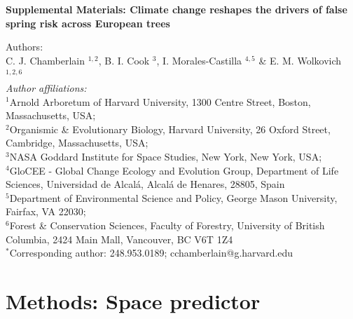 \documentclass{article}\usepackage[]{graphicx}\usepackage[]{color}
\begin{document}
\noindent 
\textbf{\LARGE{Supplemental Materials: Climate change reshapes the drivers of false spring risk across European trees}} 



\noindent Authors:\\
C. J. Chamberlain $^{1,2}$, B. I. Cook $^{3}$, I. Morales-Castilla $^{4,5}$ \& E. M. Wolkovich $^{1,2,6}$
\vspace{2ex}\\
\emph{Author affiliations:}\\
$^{1}$Arnold Arboretum of Harvard University, 1300 Centre Street, Boston, Massachusetts, USA; \\
$^{2}$Organismic \& Evolutionary Biology, Harvard University, 26 Oxford Street, Cambridge, Massachusetts, USA; \\
$^{3}$NASA Goddard Institute for Space Studies, New York, New York, USA; \\
$^{4}$GloCEE - Global Change Ecology and Evolution Group, Department of Life Sciences, Universidad de Alcal\'{a}, Alcal\'{a} de Henares, 28805, Spain \\
$^{5}$Department of Environmental Science and Policy, George Mason University, Fairfax, VA 22030; \\
$^{6}$Forest \& Conservation Sciences, Faculty of Forestry, University of British Columbia, 2424 Main Mall, Vancouver, BC V6T 1Z4\\
\vspace{2ex}
$^*$Corresponding author: 248.953.0189; cchamberlain@g.harvard.edu\\

\renewcommand{\thetable}{S\arabic{table}}
\renewcommand{\thefigure}{S\arabic{figure}}
\renewcommand{\labelitemi}{$-$}

\section*{Methods: Space predictor} %
\end{document}
